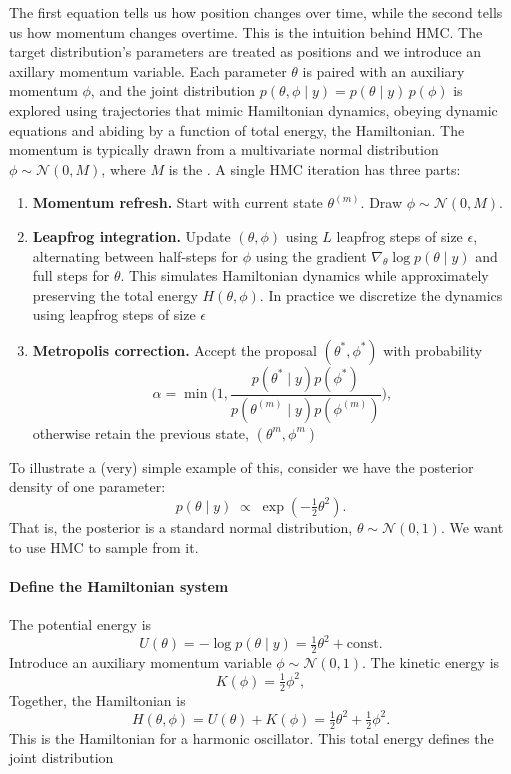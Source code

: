 The first equation tells us how position changes over time, while the second tells us how momentum changes overtime.  
This is the intuition behind HMC.  
The target distribution's parameters are treated as positions and we introduce an axillary momentum variable.  
Each parameter $\theta$ is paired with an auxiliary momentum $\phi$, and the joint distribution $p(\theta, \phi \mid y) = p(\theta \mid y)\,p(\phi)$ is explored using trajectories that mimic Hamiltonian dynamics, 
obeying dynamic equations and abiding by a function of total energy, the Hamiltonian.  
The momentum is typically drawn from a multivariate normal distribution $\phi \sim \mathcal N(0, M)$, where $M$ is the .  
A single HMC iteration has three parts:

\begin{enumerate}
\item \textbf{Momentum refresh.} Start with current state $\theta^{(m)}$.  Draw $\phi \sim \mathcal N(0, M)$.
\item \textbf{Leapfrog integration.} Update $(\theta, \phi)$ using $L$ leapfrog steps of size $\epsilon$, 
        alternating between half-steps for $\phi$ using the gradient $\nabla_\theta \log p(\theta \mid y)$ and 
        full steps for $\theta$.  This simulates Hamiltonian dynamics while approximately preserving the total energy $H(\theta,\phi)$.  
        In practice we discretize the dynamics using leapfrog steps of size \(\epsilon\)
\item \textbf{Metropolis correction.} Accept the proposal $(\theta^\ast,\phi^\ast)$
with probability
\[
\alpha = \min\!\Bigg(1,
\frac{p(\theta^\ast \mid y)p(\phi^\ast)}
{p(\theta^{(m)} \mid y)p(\phi^{(m)})}\Bigg),
\]
otherwise retain the previous state, \(\left(\theta^{m}, \phi^{m}\right)\)
\end{enumerate}

To illustrate a (very) simple example of this, consider we have the posterior density of one parameter:
\[
p(\theta \mid y) \;\propto\; \exp\!\left(-\tfrac{1}{2}\theta^2\right).
\]
That is, the posterior is a standard normal distribution,
$\theta \sim \mathcal N(0,1)$. We want to use HMC to sample from it.

\paragraph{Define the Hamiltonian system}
The potential energy is
\[
U(\theta) = -\log p(\theta \mid y) = \tfrac{1}{2}\theta^2 + \text{const}.
\]
Introduce an auxiliary momentum variable $\phi \sim \mathcal N(0,1)$. The kinetic energy is
\[
K(\phi) = \tfrac{1}{2}\phi^2,
\]
Together, the Hamiltonian is
\[
H(\theta,\phi) = U(\theta)+K(\phi) = \tfrac{1}{2}\theta^2+\tfrac{1}{2}\phi^2.
\]
This is the Hamiltonian for a harmonic oscillator\cite{taylor_classical_2005}.  This total energy defines the joint distribution

